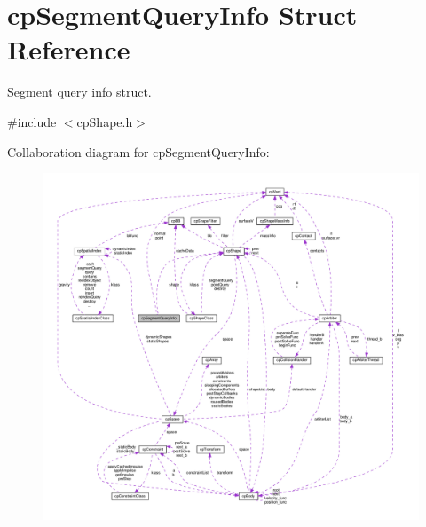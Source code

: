 \hypertarget{structcpSegmentQueryInfo}{}\section{cp\+Segment\+Query\+Info Struct Reference}
\label{structcpSegmentQueryInfo}


Segment query info struct.  




{\ttfamily \#include $<$cp\+Shape.\+h$>$}



Collaboration diagram for cp\+Segment\+Query\+Info\+:
\nopagebreak
\begin{figure}[H]
\begin{center}
\leavevmode
\includegraphics[width=350pt]{structcpSegmentQueryInfo__coll__graph}
\end{center}
\end{figure}
